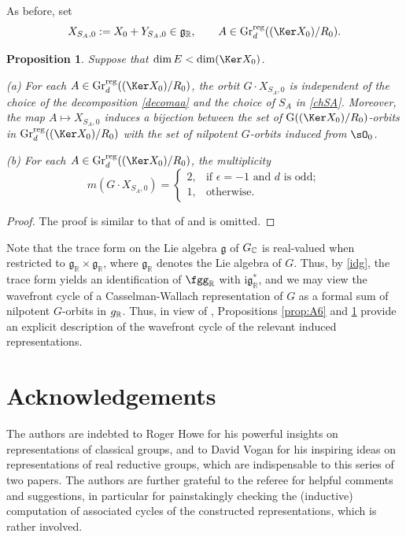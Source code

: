 \documentclass[11pt,a4paper]{amsart}
\newcommand{\g}{\mathfrak g}
\newcommand{\R}{\mathbb R}
\numberwithin{equation}{section}
\newtheorem{prop}[thm]{Proposition}
\theoremstyle{remark}
\begin{document}
As before, set
\[X_{S_A,0}:=X_0+Y_{S_A,0}\in \g_\R, \qquad A \in \mathrm{Gr}^{\mathrm{reg}}_d((\Ker X_0)/R_0).\]


\begin{prop}\label{prop:A7}
Suppose that $\dim E < \dim (\Ker X_0)$. 

\noindent (a) For each $A\in\mathrm{Gr}^{\mathrm{reg}}_d((\Ker X_0)/R_0) $, the orbit $G\cdot X_{S_A,0}$ is independent of the  choice of the decomposition \eqref{decomaa} and 
the choice of $S_A$ in \eqref{chSA}. Moreover, the map $A\mapsto
X_{S_A,0}$ induces a bijection between the set of $\mathrm{G}((\Ker X_0)/R_0)$-orbits in $\mathrm{Gr}^{\mathrm{reg}}_d((\Ker X_0)/R_0)$ with the set of nilpotent $G$-orbits induced  from $\sO_0$. 

\noindent (b) For each $A\in\mathrm{Gr}^{\mathrm{reg}}_d((\Ker X_0)/R_0) $, 
the multiplicity
\[
m(G\cdot X_{S_A,0}) = \begin{cases}
2 , & \text{if $\epsilon=-1$ and $d$ is odd};\\
1, & \text{otherwise}.
\end{cases}
\]
\end{prop}
\begin{proof}
The proof is similar to that of  and is omitted. 
\end{proof}



Note that the trace form on the Lie algebra $\g$ of $G_{\mathbb{C}}$ is real-valued when restricted to $\g_\R\times \g_\R$, where $\g_\R$ denotes the Lie algebra of $G$. Thus, by \eqref{idg}, the trace form yields an identification of $\fgg_\R$ with  $\mathrm i \g_\R^*$, and we may view the wavefront cycle of a Casselman-Wallach representation  of $G$ as a formal sum of nilpotent $G$-orbits in $\mathrm \g_\R$. Thus, in view of , Propositions \ref{prop:A6} and \ref{prop:A7} provide an explicit description of the wavefront cycle of the relevant induced representations. 


\section*{Acknowledgements}

The authors are indebted to Roger Howe for his powerful insights on representations of classical groups, and to David Vogan for his inspiring ideas on representations of real reductive groups, which are indispensable to this series of two papers.  The authors are further grateful to the referee for helpful comments and suggestions, in particular for painstakingly checking the (inductive) computation of associated cycles of the constructed representations, which is rather involved. 
\end{document}
